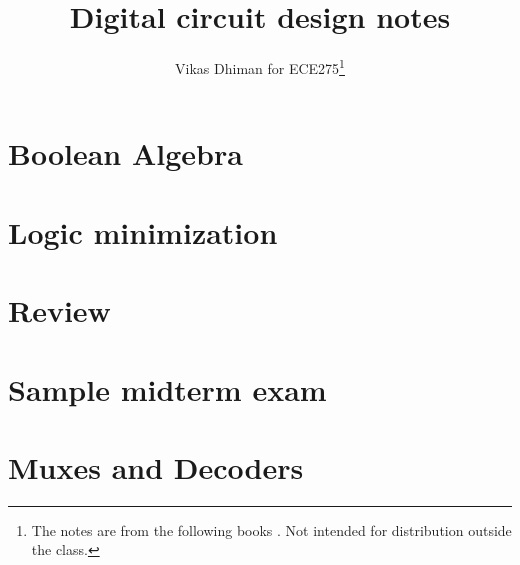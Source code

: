 \documentclass[oneside]{book}
\title{Digital circuit design notes}
\author{Vikas Dhiman for ECE275\footnote{The notes are from the following books \cite{harris2022digital,stephen2022fundamentals}. Not intended for distribution outside the class.}}
\begin{document}
\maketitle

\tableofcontents
\newpage
\listoftodos


\newpage


\chapter{Boolean Algebra}


% 
%
% 
% 
\chapter{Logic minimization}




\chapter*{Review}

\chapter{Sample midterm exam}

% 
% 
% 
% 
\chapter{Muxes and Decoders}

\end{document}
